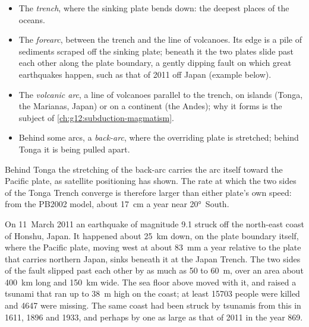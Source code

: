 \begin{itemize}
  \item The \emph{trench}, where the sinking plate bends down: the deepest
        places of the oceans.
  \item The \emph{forearc}, between the trench and the line of volcanoes. Its
        edge is a pile of sediments scraped off the sinking plate; beneath it
        the two plates slide past each other along the plate boundary, a
        gently dipping fault on which great earthquakes happen, such as
        that of 2011 off Japan (example below).
  \item The \emph{volcanic arc}, a line of volcanoes parallel to the trench,
        on islands (Tonga, the Marianas, Japan) or on a continent (the Andes);
        why it forms is the subject of \cref{ch:g12:subduction-magmatism}.
  \item Behind some arcs, a \emph{back-arc}, where the overriding plate is
        stretched; behind Tonga it is being pulled apart.
\end{itemize}

Behind Tonga the stretching of the back-arc carries the arc itself toward the
Pacific plate, as satellite positioning has shown. The rate at which the two sides of the Tonga Trench converge
is therefore larger than either plate's own speed: from the PB2002 model,
about \qty{17}{cm} a year near \ang{20}~South.

\begin{example}\label{ex:g11:subduction-zones:tohoku}
On 11~March 2011 an earthquake of magnitude 9.1 struck off the north-east
coast of Honshu, Japan. It happened about \qty{25}{km} down, on the plate
boundary itself, where the Pacific plate, moving west at about \qty{83}{mm} a
year relative to the plate that carries northern Japan, sinks beneath it at
the Japan Trench. The two sides of the fault slipped past each other by as
much as 50 to \qty{60}{m}, over an area about \qty{400}{km} long and
\qty{150}{km} wide. The sea floor above moved with it, and raised a tsunami
that ran up to \qty{38}{m} high on the coast; at least \num{15703} people were
killed and \num{4647} were missing. The same coast had been struck by
tsunamis from this  in 1611, 1896 and 1933, and perhaps by one
as large as that of 2011 in the year 869.
\end{example}

